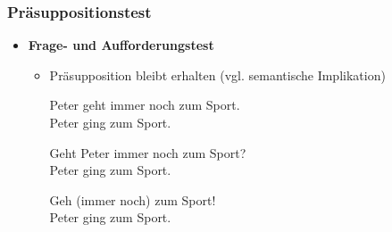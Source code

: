 
\begin{frame}
\frametitle{Präsuppositionstest}

\begin{itemize}
	\item \textbf{Frage- und Aufforderungstest}
	
	\begin{itemize}
		\item Präsupposition bleibt erhalten (vgl. semantische Implikation)
		
		\ea Peter geht immer noch zum Sport.\\ \prspp Peter ging zum Sport.
		\z
		
		\ea Geht Peter immer noch zum Sport?\\ \prspp Peter ging zum Sport.
		\z
		
		\ea Geh (immer noch) zum Sport!\\ \prspp Peter ging zum Sport.
		\z
		
		
%		
%		
		
		\end{itemize}

\end{itemize}

\end{frame}



